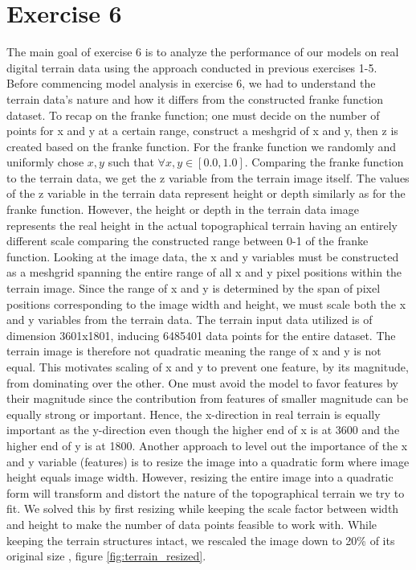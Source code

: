 \documentclass[11pt, a4paper]{article}
\begin{document}
\section*{Exercise 6}
The main goal of exercise 6 is to analyze the performance of our models on real digital terrain data using the approach conducted in previous exercises 1-5. Before commencing model analysis in exercise 6, we had to understand the terrain data's nature and how it differs from the constructed franke function dataset. 
To recap on the franke function; one must decide on the number of points for x and y at a certain range, construct a meshgrid of x and y, then z is created based on the franke function. For the franke function we randomly and uniformly chose $x,y$ such that $\forall x,y  \in{[0.0,1.0]}$.
Comparing the franke function to the terrain data, we get the z variable from the terrain image itself. The values of the z variable in the terrain data represent height or depth similarly as for the franke function. However, the height or depth in the terrain data image represents
the real height in the actual topographical terrain having an entirely different scale comparing the constructed range between 0-1 of the franke function. Looking at the image data, the x and y variables must be constructed as a meshgrid spanning the entire range of all x and y pixel positions within the terrain image. 
Since the range of x and y is determined by the span of pixel positions corresponding to the image width and height, we must scale both the x and y variables from the terrain data. The terrain input data utilized is of dimension 3601x1801, inducing 6485401 data points for the entire dataset. The terrain image is therefore not quadratic meaning the range of x and y is not equal. 
This motivates scaling of x and y to prevent one feature, by its magnitude, from dominating over the other. One must avoid the model to favor features by their magnitude since the contribution from features of smaller magnitude can be equally strong or important. 
Hence, the x-direction in real terrain is equally important as the y-direction even though the higher end of x is at 3600 and the higher end of y is at 1800. Another approach to level out the importance of the x and y variable (features) is to resize the image into a quadratic form where image height equals image width. 
However, resizing the entire image into a quadratic form will transform and distort the nature of the topographical terrain we try to fit. We solved this by first resizing while keeping the scale factor between width and height to make the number of data points feasible to work with. While keeping the terrain structures intact, we rescaled the image down to 20\% of its original size , figure \ref{fig:terrain_resized}.
\end{document}
